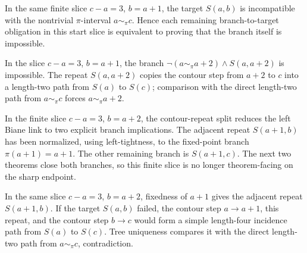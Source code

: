 \begin{theorem}
  \label{thm:left-start-target-impossible}
  \leanok
  In the same finite slice \(c-a=3\), \(b=a+1\), the target \(S(a,b)\) is
  incompatible with the nontrivial \(\pi\)-interval \(a\sim_\pi c\).  Hence
  each remaining branch-to-target obligation in this start slice is equivalent
  to proving that the branch itself is impossible.
\end{theorem}

\begin{theorem}
  \label{thm:left-start-residual}
  \leanok
  In the slice \(c-a=3\), \(b=a+1\), the branch
  \(\neg(a\sim_\pi a+2)\wedge S(a,a+2)\) is impossible.  The repeat
  \(S(a,a+2)\) copies the contour step from \(a+2\) to \(c\) into a
  length-two path from \(S(a)\) to \(S(c)\); comparison with the direct
  length-two path from \(a\sim_\pi c\) forces \(a\sim_\pi a+2\).
\end{theorem}

\begin{theorem}
  \label{thm:left-gap-three-end-reduction}
  \leanok
  In the finite slice \(c-a=3\), \(b=a+2\), the contour-repeat split reduces
  the left Biane link to two explicit branch implications.  The adjacent
  repeat \(S(a+1,b)\) has been normalized, using left-tightness, to the
  fixed-point branch \(\pi(a+1)=a+1\).  The other remaining branch is
  \(S(a+1,c)\).  The next two theorems close both branches, so this finite
  slice is no longer theorem-facing on the sharp endpoint.
\end{theorem}

\begin{theorem}
  \label{thm:left-gap-three-fixed-a1}
  \leanok
  In the same slice \(c-a=3\), \(b=a+2\), fixedness of \(a+1\) gives the
  adjacent repeat \(S(a+1,b)\).  If the target \(S(a,b)\) failed, the contour
  step \(a\to a+1\), this repeat, and the contour step \(b\to c\) would form a
  simple length-four incidence path from \(S(a)\) to \(S(c)\).  Tree
  uniqueness compares it with the direct length-two path from \(a\sim_\pi c\),
  contradiction.
\end{theorem}

